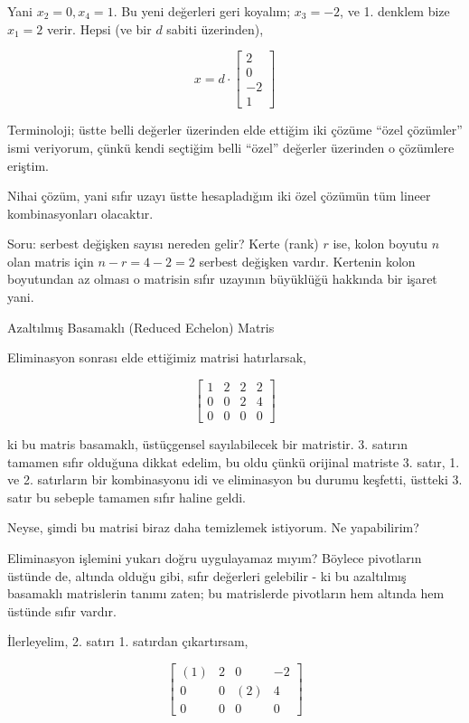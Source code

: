 \documentclass[12pt,fleqn]{article}\usepackage{../../common}
\begin{document}
Yani $x_2=0,x_4=1$. Bu yeni değerleri geri koyalım; $x_3=-2$, ve 1. denklem
bize $x_1=2$ verir. Hepsi (ve bir $d$ sabiti üzerinden),

$$ x = d \cdot 
\left[\begin{array}{r}
2\\
0\\
-2\\
1
\end{array}\right]
 $$

Terminoloji; üstte belli değerler üzerinden elde ettiğim iki çözüme ``özel
çözümler'' ismi veriyorum, çünkü kendi seçtiğim belli ``özel'' değerler
üzerinden o çözümlere eriştim. 

Nihai çözüm, yani sıfır uzayı üstte hesapladığım iki özel çözümün tüm
lineer kombinasyonları olacaktır. 

Soru: serbest değişken sayısı nereden gelir? Kerte (rank) $r$ ise, kolon boyutu
$n$ olan matris için $n-r = 4-2 = 2$ serbest değişken vardır. Kertenin kolon
boyutundan az olması o matrisin sıfır uzayının büyüklüğü hakkında bir işaret
yani.

Azaltılmış Basamaklı (Reduced Echelon) Matris 

Eliminasyon sonrası elde ettiğimiz matrisi hatırlarsak,

$$ 
\left[\begin{array}{cccc}
1 & 2 & 2 & 2  \\
0 & 0 & 2 & 4 \\
0 & 0 & 0 & 0
\end{array}\right]
 $$

ki bu matris basamaklı, üstüçgensel sayılabilecek bir matristir. 3. satırın
tamamen sıfır olduğuna dikkat edelim, bu oldu çünkü orijinal matriste
3. satır, 1. ve 2. satırların bir kombinasyonu idi ve eliminasyon bu durumu
keşfetti, üstteki 3. satır bu sebeple tamamen sıfır haline geldi. 

Neyse, şimdi bu matrisi biraz daha temizlemek istiyorum. Ne yapabilirim? 

Eliminasyon işlemini yukarı doğru uygulayamaz mıyım? Böylece pivotların
üstünde de, altında olduğu gibi, sıfır değerleri gelebilir - ki bu
azaltılmış basamaklı matrislerin tanımı zaten; bu matrislerde pivotların
hem altında hem üstünde sıfır vardır.

İlerleyelim, 2. satırı 1. satırdan çıkartırsam, 

$$ 
\left[\begin{array}{cccc}
(1) & 2 & 0 & -2  \\
0 & 0 & (2) & 4 \\
0 & 0 & 0 & 0
\end{array}\right]
 $$
\end{document}
